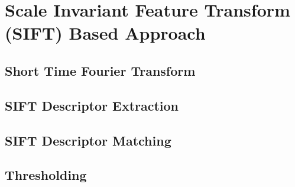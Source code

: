 \section{Scale Invariant Feature Transform (SIFT) Based Approach}

\subsection{Short Time Fourier Transform}

\subsection{SIFT Descriptor Extraction}

\subsection{SIFT Descriptor Matching}

\subsection{Thresholding}
\label{subsection:thresholding}